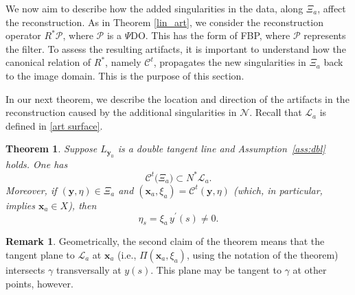 \documentclass[11pt]{article}
\newcommand{\jc}[1]{\begin{quotation}\textbf{James' comment:\
}{\textit{#1}}\end{quotation}}
\newcommand{\be}{\begin{equation}}
\newcommand{\ee}{\end{equation}}
\newcommand{\cC}{\mathcal C}
\newcommand{\CL}{\mathcal L}
\newcommand{\ga}{\gamma}
\numberwithin{equation}{section}
\newcommand{\vy}{\mathbf{y}}
\newcommand{\vx}{\mathbf{x}}
\newcommand{\Cc}{\mathcal{C}}
\newtheorem{theorem}{Theorem}[section]
\theoremstyle{definition}
\newtheorem{remark}{Remark}
\begin{document}
We now aim to describe how the added singularities in the data, along $\Xi_a$, affect the reconstruction. As in Theorem \ref{lin_art}, we consider the reconstruction operator $R^* \mathcal{P}$, where $\mathcal{P}$ is a $\Psi$DO. This has the form of FBP, where $\mathcal{P}$ represents the filter. To assess the resulting artifacts, it is important to understand how the canonical relation of $R^*$, namely $\Cc^t$, propagates the new singularities in $\Xi_a$ back to the image domain. This is the purpose of this section.

In our next theorem, we describe the location and direction of the artifacts in the reconstruction caused by the additional singularities in $\mathcal{N}$. Recall that $\CL_a$ is defined in \eqref{art surface}.

\begin{theorem}\label{thm:C nonlin_art}
Suppose $L_{\vy_0}$ is a double tangent line and  Assumption~\ref{ass:dbl} holds. One has
\be
\label{nonlin_art_equ}
\cC^t\big(\Xi_a\big)\subset  N^*\CL_a.
\ee
Moreover, if $(\vy,\eta)\in \Xi_a$ and $(\vx_a,\xi_a)=\cC^t(\vy,\eta)$ (which, in particular, implies $\vx_a\in X$), then
\be
\eta_s=\xi_a\, y^\prime(s)\not=0.
\ee
\end{theorem}

{\begin{remark}
    Geometrically, the second claim of the theorem means that the tangent plane to $\mathcal{L}_a$ at $\vx_a$ (i.e., $\Pi(\vx_a,\xi_a)$, using the notation of the theorem) intersects $\gamma$ transversally at $y(s)$.  This plane may be tangent to $\ga$ at other points, however.
\end{remark}}
\end{document}
